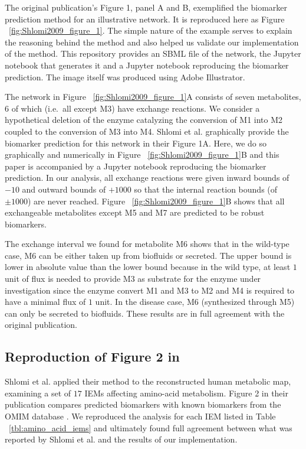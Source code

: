 \documentclass[10pt,a4paper,onecolumn]{article}
\begin{document}
The original publication's Figure 1, panel A and B, exemplified the
biomarker prediction method for an illustrative network. It is
reproduced here as Figure ~\ref{fig:Shlomi2009_figure_1}. The simple
nature of the example serves to explain the reasoning behind the method
and also helped us validate our implementation of the method. This
repository provides an SBML file of the network, the Jupyter notebook
that generates it and a Jupyter notebook reproducing the biomarker
prediction. The image itself was produced using Adobe Illustrator.

The network in Figure ~\ref{fig:Shlomi2009_figure_1}A consists of seven
metabolites, \(6\) of which (i.e.~all except M3) have exchange
reactions. We consider a hypothetical deletion of the enzyme catalyzing
the conversion of M1 into M2 coupled to the conversion of M3 into M4.
Shlomi et al. graphically provide the biomarker prediction for this
network in their Figure 1A. Here, we do so graphically and numerically
in Figure ~\ref{fig:Shlomi2009_figure_1}B and this paper is accompanied
by a Jupyter notebook reproducing the biomarker prediction. In our
analysis, all exchange reactions were given inward bounds of \(-10\) and
outward bounds of \(+1000\) so that the internal reaction bounds (of
\(\pm 1000\)) are never reached. Figure ~\ref{fig:Shlomi2009_figure_1}B
shows that all exchangeable metabolites except M5 and M7 are predicted
to be robust biomarkers.

The exchange interval we found for metabolite M6 shows that in the
wild-type case, M6 can be either taken up from biofluids or secreted.
The upper bound is lower in absolute value than the lower bound because
in the wild type, at least \(1\) unit of flux is needed to provide M3 as
substrate for the enzyme under investigation since the enzyme convert M1
and M3 to M2 and M4 is required to have a minimal flux of \(1\) unit. In
the disease case, M6 (synthesized through M5) can only be secreted to
biofluids. These results are in full agreement with the original
publication.

\subsection{\texorpdfstring{Reproduction of Figure 2 in
\autocite{Shlomi2009}}{Reproduction of Figure 2 in {[}@Shlomi2009{]}}}\label{reproduction-of-figure-2-in-shlomi2009}

Shlomi et al. applied their method to the reconstructed human metabolic
map, examining a set of \(17\) IEMs affecting amino-acid metabolism.
Figure 2 in their publication compares predicted biomarkers with known
biomarkers from the OMIM database \autocite{McKusick2007}. We reproduced
the analysis for each IEM listed in Table ~\ref{tbl:amino_acid_iems} and
ultimately found full agreement between what was reported by Shlomi et
al. and the results of our implementation.
\end{document}

